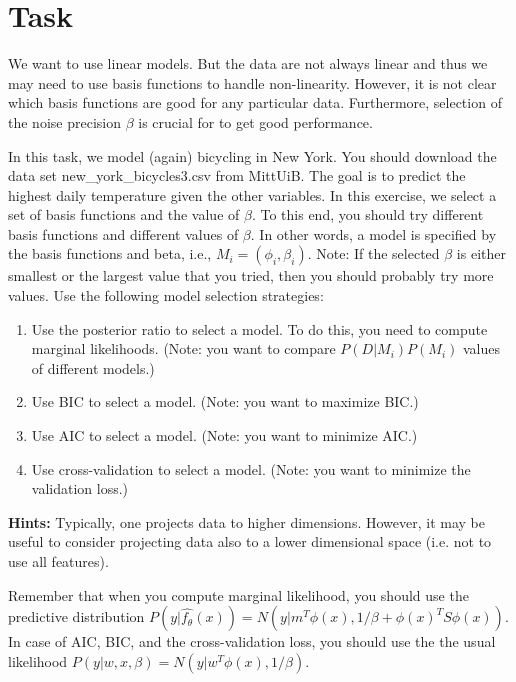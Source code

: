 \documentclass[12pt]{article}
\begin{document}
\section{Task}
\begin{tcolorbox}[breakable]
    We want to use linear models. But the data are not always linear and thus we may need to use basis functions to     handle non-linearity. However, it is not clear which basis functions are good for any particular data.  Furthermore, selection of the noise precision $\beta$ is crucial for to get good performance. 

    \vspace{5mm}
    In this task, we model (again) bicycling in New York. You should download the data set new\_york\_bicycles3.csv from MittUiB. The goal is to predict the highest daily temperature given the other variables. In this exercise, we select a set of basis functions and the value of $\beta$. To this end, you should try different basis functions and different values of $\beta$. In other words, a model is specified by the basis functions and beta,   i.e., $M_i = (\phi_i ,\beta_i ).$ Note: If the selected $\beta$ is either smallest or the largest value that you  tried, then you should probably try more values. Use the following model selection strategies: 

    \begin{enumerate}
        \item Use the posterior ratio to select a model. To do this, you need to compute marginal likelihoods.  (Note: you want to compare $P(D | M_i )P(M_i)$ values of different models.) 
        \item Use BIC to select a model. (Note: you want to maximize BIC.) 
        \item Use AIC to select a model. (Note: you want to minimize AIC.) 
        \item Use cross-validation to select a model. (Note: you want to minimize the validation loss.) 
    \end{enumerate}

    \textbf{Hints:} Typically, one projects data to higher dimensions. However, it may be useful to consider projecting data also to a lower dimensional space (i.e. not to use all features). 

    \vspace{3mm}
    Remember that when you compute marginal likelihood, you should use the predictive distribution $P(y | \hat{f_\theta}(x)) = N(y | m^T \phi(x),1/\beta + \phi(x)^T S\phi(x)).$ In case of AIC, BIC, and the cross-validation loss, you should use the the usual likelihood $P(y|w,x,\beta) = N(y|w^T \phi(x),1/\beta).$ 


\end{tcolorbox}
\end{document}

